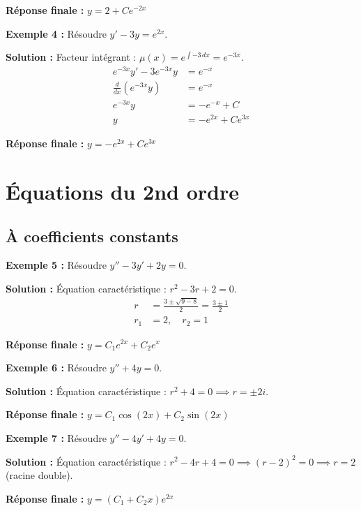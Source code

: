 \documentclass[11pt]{article}
\begin{document}
\textbf{Réponse finale :} $\boxed{y = 2 + C e^{-2x}}$

\bigskip

\textbf{Exemple 4 :} Résoudre $y' - 3y = e^{2x}$.

\textbf{Solution :}
Facteur intégrant : $\mu(x) = e^{\int -3 \, dx} = e^{-3x}$.
\begin{align*}
    e^{-3x} y' - 3 e^{-3x} y &= e^{-x} \\
    \frac{d}{dx}(e^{-3x} y) &= e^{-x} \\
    e^{-3x} y &= -e^{-x} + C \\
    y &= -e^{2x} + C e^{3x}
\end{align*}

\textbf{Réponse finale :} $\boxed{y = -e^{2x} + C e^{3x}}$

\newpage

\section{Équations du 2nd ordre}

\subsection{À coefficients constants}

\textbf{Exemple 5 :} Résoudre $y'' - 3y' + 2y = 0$.

\textbf{Solution :}
Équation caractéristique : $r^2 - 3r + 2 = 0$.
\begin{align*}
    r &= \frac{3 \pm \sqrt{9 - 8}}{2} = \frac{3 \pm 1}{2} \\
    r_1 &= 2, \quad r_2 = 1
\end{align*}

\textbf{Réponse finale :} $\boxed{y = C_1 e^{2x} + C_2 e^{x}}$

\bigskip

\textbf{Exemple 6 :} Résoudre $y'' + 4y = 0$.

\textbf{Solution :}
Équation caractéristique : $r^2 + 4 = 0 \implies r = \pm 2i$.

\textbf{Réponse finale :} $\boxed{y = C_1 \cos(2x) + C_2 \sin(2x)}$

\bigskip

\textbf{Exemple 7 :} Résoudre $y'' - 4y' + 4y = 0$.

\textbf{Solution :}
Équation caractéristique : $r^2 - 4r + 4 = 0 \implies (r - 2)^2 = 0 \implies r = 2$ (racine double).

\textbf{Réponse finale :} $\boxed{y = (C_1 + C_2 x) e^{2x}}$
\end{document}
